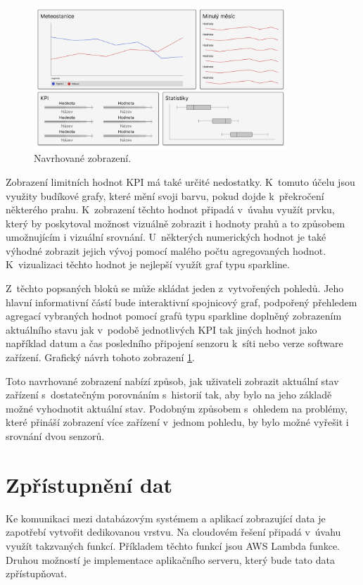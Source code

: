 \begin{figure}[H]
\label{view1}
\begin{center}
    \includegraphics[width=0.85\textwidth]{obrazky-figures/view1.pdf}
\end{center}
\caption{Navrhované zobrazení.}
\end{figure}

Zobrazení limitních hodnot KPI má také určité nedostatky. K~tomuto účelu jsou využity budíkové grafy, které mění svoji barvu, pokud dojde k~překročení některého prahu. K~zobrazení těchto hodnot připadá v~úvahu využít prvku, který by poskytoval možnost vizuálně zobrazit i hodnoty prahů a to způsobem umožnujícím i vizuální srovnání. U~některých numerických hodnot je také výhodné zobrazit jejich vývoj pomocí malého počtu agregovaných hodnot. K~vizualizaci těchto hodnot je nejlepší využít graf typu sparkline.

Z~těchto popsaných bloků se může skládat jeden z~vytvořených pohledů. Jeho hlavní informativní částí bude interaktivní spojnicový graf, podpořený přehledem agregací vybraných hodnot pomocí grafů typu sparkline doplněný zobrazením aktuálního stavu jak v~podobě jednotlivých KPI tak jiných hodnot jako například datum a čas posledního připojení senzoru k~síti nebo verze software zařízení. Grafický návrh tohoto zobrazení \ref{view1}.

Toto navrhované zobrazení nabízí způsob, jak uživateli zobrazit aktuální stav zařízení s~dostatečným porovnáním s~historií tak, aby bylo na jeho základě možné vyhodnotit aktuální stav. Podobným způsobem s~ohledem na problémy, které přináší zobrazení více zařízení v~jednom pohledu, by bylo možné vyřešit i srovnání dvou senzorů.

\section{Zpřístupnění dat}
\label{API_proposal}
Ke komunikaci mezi databázovým systémem a aplikací zobrazující data je zapotřebí vytvořit dedikovanou vrstvu. Na cloudovém řešení připadá v~úvahu využít takzvaných  funkcí. Příkladem těchto funkcí jsou AWS Lambda funkce. Druhou možností je implementace aplikačního serveru, který bude tato data zpřístupňovat. 

